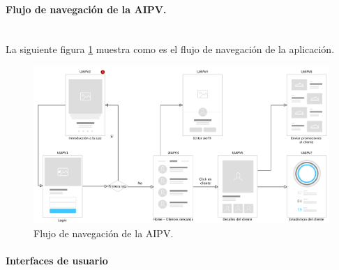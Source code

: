 \paragraph{Flujo de navegación de la AIPV.} ~\\

La siguiente figura \ref{navegacion-AIPV1} muestra como es el flujo de navegación de la aplicación.

\FloatBarrier
\begin{figure}[htbp!]
		\centering
			\includegraphics[width=1 \textwidth]{imagenes/adrian/vendedor/prototipo1/UIApp/0}
		\caption{Flujo de navegación de la AIPV.}
		\label{navegacion-AIPV1}
\end{figure}

\paragraph{Interfaces de usuario}




